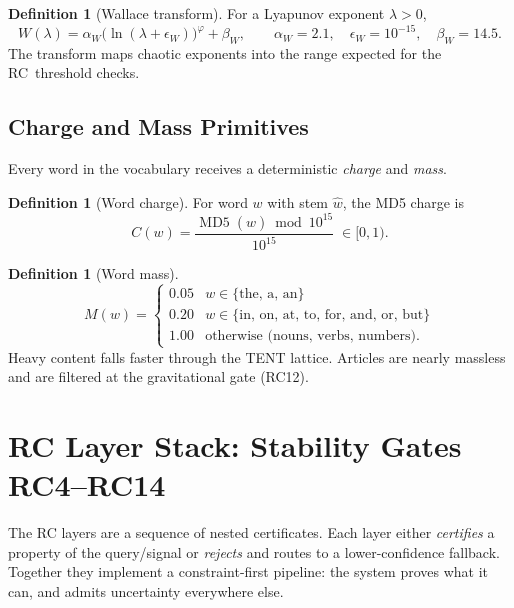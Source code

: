 \documentclass[12pt,a4paper]{article}
\theoremstyle{plain}
\theoremstyle{definition}
\newtheorem{definition}[theorem]{Definition}
\theoremstyle{remark}
\newcommand{\PHI}{\varphi}   %
\begin{document}
\begin{definition}[Wallace transform]
For a Lyapunov exponent $\lambda > 0$,
\begin{equation}
W(\lambda) = \alpha_W \bigl(\ln(\lambda + \epsilon_W)\bigr)^{\PHI}
             + \beta_W,
\qquad
\alpha_W = 2.1,\quad
\epsilon_W = 10^{-15},\quad
\beta_W = 14.5.
\end{equation}
The transform maps chaotic exponents into the range expected for
the RC~threshold checks.
\end{definition}

\subsection{Charge and Mass Primitives}

Every word in the vocabulary receives a deterministic \emph{charge}
and \emph{mass}.

\begin{definition}[Word charge]
\label{def:charge}
For word $w$ with stem $\hat w$, the MD5 charge is
\begin{equation}
C(w) = \frac{\operatorname{MD5}(\hat w) \bmod 10^{15}}{10^{15}}
      \;\in [0,1).
\end{equation}
\end{definition}

\begin{definition}[Word mass]
\begin{equation}
M(w) =
\begin{cases}
0.05 & w \in \{\text{the, a, an}\} \\
0.20 & w \in \{\text{in, on, at, to, for, and, or, but}\} \\
1.00 & \text{otherwise (nouns, verbs, numbers)}.
\end{cases}
\end{equation}
Heavy content falls faster through the TENT lattice.
Articles are nearly massless and are filtered at the gravitational
gate (RC12).
\end{definition}

\section{RC Layer Stack: Stability Gates RC4--RC14}
\label{sec:rc}

The RC layers are a sequence of nested certificates.  Each layer
either \emph{certifies} a property of the query/signal or \emph{rejects}
and routes to a lower-confidence fallback.  Together they implement a
constraint-first pipeline: the system proves what it can, and admits
uncertainty everywhere else.
\end{document}
